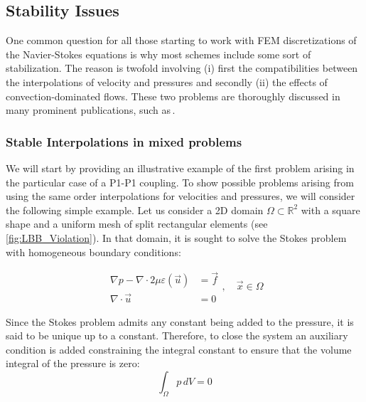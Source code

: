 \subsection{Stability Issues}
One common question for all those starting to work with FEM discretizations of the Navier-Stokes equations is why most schemes include some sort of stabilization. The reason is twofold involving (i) first the compatibilities between the interpolations of velocity and pressures and secondly (ii) the effects of convection-dominated flows. These two problems are thoroughly discussed in many prominent publications, such as\,\cite{Bazilevs2007, Brooks1982}.

\subsubsection*{Stable Interpolations in mixed problems}
We will start by providing an illustrative example of the first problem arising in the particular case of a P1-P1 coupling. To show possible problems arising from using the same order interpolations for velocities and pressures, we will consider the following simple example. Let us consider a 2D domain $\Omega\subset \mathbb{R}^2$ with a square shape and a uniform mesh of split rectangular elements (see \autoref{fig:LBB_Violation}). In that domain, it is sought to solve the Stokes problem with homogeneous boundary conditions:

\begin{equation}
	\begin{split}
		\nabla p - \nabla\cdot2\mu\varepsilon(\vec{u}) &= \vec{f}\\
		\nabla \cdot \vec{u} &= 0
	\end{split}, \quad \vec{x} \in \Omega
	\label{eqn:short_stokes}
\end{equation}

Since the Stokes problem admits any constant being added to the pressure, it is said to be unique up to a constant. Therefore, to close the system an auxiliary condition is added constraining the integral constant to ensure that the volume integral of the pressure is zero:
\begin{equation}
	\int_{\Omega} p \,dV = 0
	\label{eqn:auxiliary}
\end{equation}

